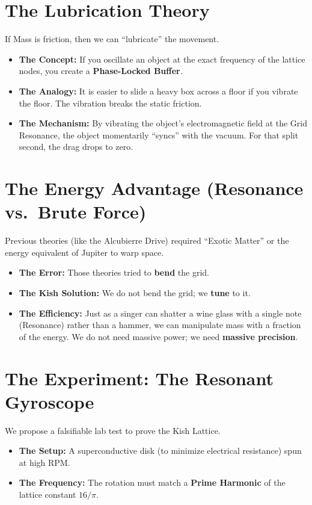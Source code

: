 \documentclass[11pt, letterpaper, openany]{book}
\begin{document}
\section{The Lubrication Theory}

If Mass is friction, then we can “lubricate” the movement.

\begin{itemize}
    \item \textbf{The Concept:} If you oscillate an object at the exact frequency of the lattice nodes,
    you create a \textbf{Phase-Locked Buffer}.
    \item \textbf{The Analogy:} It is easier to slide a heavy box across a floor if you vibrate the floor.
    The vibration breaks the static friction.
    \item \textbf{The Mechanism:} By vibrating the object’s electromagnetic field at the Grid
    Resonance, the object momentarily “syncs” with the vacuum. For that split second,
    the drag drops to zero.
\end{itemize}

\section{The Energy Advantage (Resonance vs.\ Brute Force)}

Previous theories (like the Alcubierre Drive) required “Exotic Matter” or the energy
equivalent of Jupiter to warp space.

\begin{itemize}
    \item \textbf{The Error:} Those theories tried to \textbf{bend} the grid.
    \item \textbf{The Kish Solution:} We do not bend the grid; we \textbf{tune} to it.
    \item \textbf{The Efficiency:} Just as a singer can shatter a wine glass with a single note
    (Resonance) rather than a hammer, we can manipulate mass with a fraction of the
    energy. We do not need massive power; we need \textbf{massive precision}.
\end{itemize}

\section{The Experiment: The Resonant Gyroscope}

We propose a falsifiable lab test to prove the Kish Lattice.

\begin{itemize}
    \item \textbf{The Setup:} A superconductive disk (to minimize electrical resistance) spun at high
    RPM.
    \item \textbf{The Frequency:} The rotation must match a \textbf{Prime Harmonic} of the lattice
    constant $16/\pi$.
\end{itemize}
\end{document}
